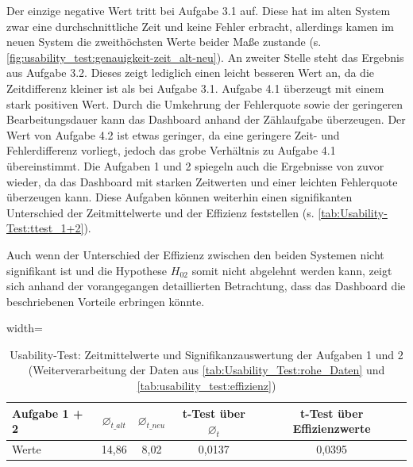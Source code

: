 Der einzige negative Wert tritt bei Aufgabe 3.1 auf. Diese hat im alten System zwar eine durchschnittliche Zeit und keine Fehler erbracht, allerdings kamen im neuen System die zweithöchsten Werte beider Maße zustande (s. \autoref{fig:usability_test:genauigkeit-zeit_alt-neu}). An zweiter Stelle steht das Ergebnis aus Aufgabe 3.2. Dieses zeigt lediglich einen leicht besseren Wert an, da die Zeitdifferenz kleiner ist als bei Aufgabe 3.1.
Aufgabe 4.1 überzeugt mit einem stark positiven Wert. Durch die Umkehrung der Fehlerquote sowie der geringeren Bearbeitungsdauer kann das Dash\-board anhand der Zählaufgabe überzeugen. Der Wert von Aufgabe 4.2 ist etwas geringer, da eine geringere Zeit- und Fehlerdifferenz vorliegt, jedoch das grobe Verhältnis zu Aufgabe 4.1 übereinstimmt.
Die Aufgaben 1 und 2 spiegeln auch die Ergebnisse von zuvor wieder, da das Dash\-board mit starken Zeitwerten und einer leichten Fehlerquote überzeugen kann. Diese Aufgaben können weiterhin einen signifikanten Unterschied der Zeitmittelwerte und der Effizienz feststellen (s. \autoref{tab:Usability-Test:ttest_1+2}).

Auch wenn der Unterschied der Effizienz zwischen den beiden Systemen nicht signifikant ist und die Hypothese $H_{02}$ somit nicht abgelehnt werden kann, zeigt sich anhand der vorangegangen detaillierten Betrachtung, dass das Dashboard die beschriebenen Vorteile erbringen könnte.


\begin{table}[H]
    \centering
    \begin{adjustbox}{width=\textwidth}
    \begin{tabular}{|l|c|c|c||c|}
    \hline
        Aufgabe 1 + 2 & $\varnothing_{t\_alt}$ & $\varnothing_{t\_neu}$ & t-Test über $\varnothing_t$ & t-Test über Effizienzwerte \\ \hline
        Werte & 14,86 & 8,02 & 0,0137 & 0,0395 \\ \hline
    \end{tabular}
    \end{adjustbox}
    \caption{Usability-Test: Zeitmittelwerte und Signifikanzauswertung der Aufgaben 1 und 2 (Weiterverarbeitung der Daten aus \autoref{tab:Usability_Test:rohe_Daten} und \autoref{tab:usability_test:effizienz})}
    \label{tab:Usability-Test:ttest_1+2}
\end{table}

